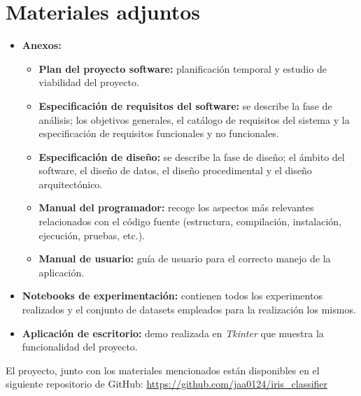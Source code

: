 \section{Materiales adjuntos}\label{materiales-adjuntos}
\begin{itemize}	
	\item \textbf{Anexos:}
	\begin{itemize}
	\tightlist
	\item
  		\textbf{Plan del proyecto software:} planificación temporal y estudio
  		de viabilidad del proyecto.
	\item
  		\textbf{Especificación de requisitos del software:} se describe la
  		fase de análisis; los objetivos generales, el catálogo de requisitos
  		del sistema y la especificación de requisitos funcionales y no
  		funcionales.
	\item
  		\textbf{Especificación de diseño:} se describe la fase de diseño; el
  		ámbito del software, el diseño de datos, el diseño procedimental y el
  		diseño arquitectónico.
	\item
  		\textbf{Manual del programador:} recoge los aspectos más relevantes
  		relacionados con el código fuente (estructura, compilación,
  		instalación, ejecución, pruebas, etc.).
	\item
  		\textbf{Manual de usuario:} guía de usuario para el correcto manejo 			de la aplicación.
	\end{itemize}
	
	\item \textbf{Notebooks de experimentación:} contienen todos los experimentos realizados y el conjunto de datasets empleados para la realización los mismos.
	\item \textbf{Aplicación de escritorio:} demo realizada en \emph{Tkinter} que muestra la funcionalidad del proyecto.
\end{itemize}

El proyecto, junto con los materiales mencionados están disponibles en el siguiente repositorio de GitHub: \url{https://github.com/jaa0124/iris_classifier}

